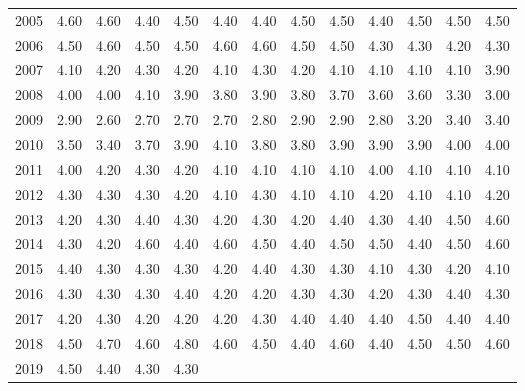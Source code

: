 \begin{longtable}{rrrrrrrrrrrrr}
  2005 & 4.60 & 4.60 & 4.40 & 4.50 & 4.40 & 4.40 & 4.50 & 4.50 & 4.40 & 4.50 & 4.50 & 4.50 \\ 
  2006 & 4.50 & 4.60 & 4.50 & 4.50 & 4.60 & 4.60 & 4.50 & 4.50 & 4.30 & 4.30 & 4.20 & 4.30 \\ 
  2007 & 4.10 & 4.20 & 4.30 & 4.20 & 4.10 & 4.30 & 4.20 & 4.10 & 4.10 & 4.10 & 4.10 & 3.90 \\ 
  2008 & 4.00 & 4.00 & 4.10 & 3.90 & 3.80 & 3.90 & 3.80 & 3.70 & 3.60 & 3.60 & 3.30 & 3.00 \\ 
  2009 & 2.90 & 2.60 & 2.70 & 2.70 & 2.70 & 2.80 & 2.90 & 2.90 & 2.80 & 3.20 & 3.40 & 3.40 \\ 
  2010 & 3.50 & 3.40 & 3.70 & 3.90 & 4.10 & 3.80 & 3.80 & 3.90 & 3.90 & 3.90 & 4.00 & 4.00 \\ 
  2011 & 4.00 & 4.20 & 4.30 & 4.20 & 4.10 & 4.10 & 4.10 & 4.10 & 4.00 & 4.10 & 4.10 & 4.10 \\ 
  2012 & 4.30 & 4.30 & 4.30 & 4.20 & 4.10 & 4.30 & 4.10 & 4.10 & 4.20 & 4.10 & 4.10 & 4.20 \\ 
  2013 & 4.20 & 4.30 & 4.40 & 4.30 & 4.20 & 4.30 & 4.20 & 4.40 & 4.30 & 4.40 & 4.50 & 4.60 \\ 
  2014 & 4.30 & 4.20 & 4.60 & 4.40 & 4.60 & 4.50 & 4.40 & 4.50 & 4.50 & 4.40 & 4.50 & 4.60 \\ 
  2015 & 4.40 & 4.30 & 4.30 & 4.30 & 4.20 & 4.40 & 4.30 & 4.30 & 4.10 & 4.30 & 4.20 & 4.10 \\ 
  2016 & 4.30 & 4.30 & 4.30 & 4.40 & 4.20 & 4.20 & 4.30 & 4.30 & 4.20 & 4.30 & 4.40 & 4.30 \\ 
  2017 & 4.20 & 4.30 & 4.20 & 4.20 & 4.20 & 4.30 & 4.40 & 4.40 & 4.40 & 4.50 & 4.40 & 4.40 \\ 
  2018 & 4.50 & 4.70 & 4.60 & 4.80 & 4.60 & 4.50 & 4.40 & 4.60 & 4.40 & 4.50 & 4.50 & 4.60 \\ 
  2019 & 4.50 & 4.40 & 4.30 & 4.30 &  &  &  &  &  &  &  &  \\ 
   \hline
\hline
\end{longtable}
